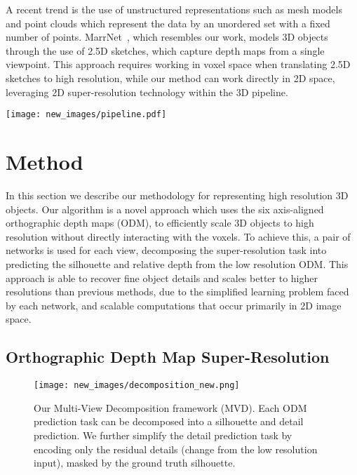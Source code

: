 \documentclass{article}
\begin{document}
A recent trend is the use of unstructured representations such as mesh models \cite{pontes2017image2mesh,kato2017neural,pixel2mesh} and point clouds \cite{qi2017pointnet,fan2017point} which represent the data by an unordered set with a fixed number of points. MarrNet~\cite{wu2017marrnet}, which resembles our work, models 3D objects through the use of 2.5D sketches, which capture depth maps from a single viewpoint. This approach requires working in voxel space when translating 2.5D sketches to high resolution, while our method can work directly in 2D space, leveraging 2D super-resolution technology within the 3D pipeline. 

\begin{figure*}
\texttt{[image: new\_images/pipeline.pdf]}
\centering
\caption{The complete pipeline for 3D object reconstruction and super-resolution outlined in this paper. Our method accepts either a single RGB image for low resolution reconstruction or a low resolution object for 3D super-resolution. ODM up-scaling is defined in section \ref{sec:odmSR} and model carving in section \ref{sec:model-carving}} 
\label{Pipeline} 
\end{figure*}

\section{Method}

In this section we describe our methodology for representing high resolution 3D objects. Our algorithm is a novel approach which uses the six axis-aligned orthographic depth maps (ODM), to efficiently scale 3D objects to high resolution without directly interacting with the voxels. To achieve this, a pair of networks is used for each view, decomposing the super-resolution task into predicting the silhouette and relative depth from the low resolution ODM. This approach is able to recover fine object details and scales better to higher resolutions than previous methods, due to the simplified learning problem faced by each network, and scalable computations that occur primarily in 2D image space.  

\subsection{Orthographic Depth Map Super-Resolution} \label{sec:odmSR}
 
\begin{figure}
\centering
\texttt{[image: new\_images/decomposition\_new.png]}
\caption{Our Multi-View Decomposition framework (MVD). Each ODM prediction task can be decomposed into a silhouette and detail prediction. We further simplify the detail prediction task by encoding only the residual details (change from the low resolution input), masked by the ground truth silhouette.} \label{fig:decomposition}
\end{figure}
\end{document}
